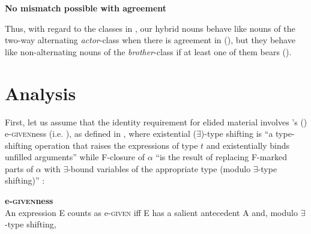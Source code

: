 \documentclass[output=paper,modfonts,newtxmath,hidelinks]{langscibook}
\begin{document}
\ea \textbf{No mismatch possible with  agreement}\label{14:ex18}
        \z \z

\noindent Thus, with regard to the  classes in , our hybrid nouns behave like nouns of the two-way alternating \textit{actor}-class when there is agreement in  (), but they behave like non-alternating nouns of the \textit{brother}-class if at least one of them bears  ().
		
		
\section{Analysis}	
		
		First, let us assume that the identity requirement for elided material involves \citeauthor{merchant2001}'s (\citeyear{merchant2001}) e-\textsc{given}ness (i.e. ), as defined in , where existential ($\exists$)-type shifting is ``a type-shifting operation that raises the expressions of type $t$ and existentially binds unfilled arguments'' while F-closure of $\alpha$ ``is the result of replacing F-marked parts of $\alpha$ with $\exists$-bound variables of the appropriate type (modulo $\exists$-type shifting)'' \citep[14]{merchant2001}: 
		
		\ea \label{14:egive} \textbf{e-\textsc{given}ness} \citep[26]{merchant2001}\\
		An expression E counts as e-\textsc{given} iff E has a salient antecedent A and, modulo $\exists$-type shifting,
        \begin{xlist}
        \end{xlist}
        \z
\end{document}
